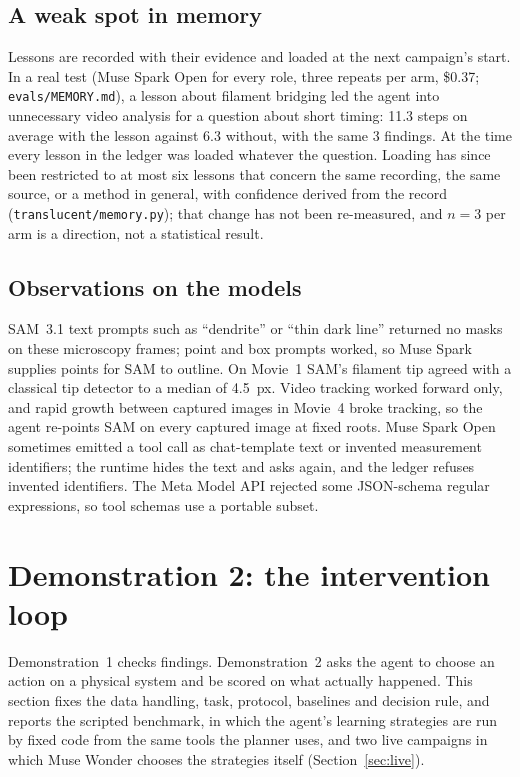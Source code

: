 \documentclass[11pt]{article}
\newcommand{\cmd}[1]{\texttt{#1}}
\begin{document}
\subsection{A weak spot in memory}
Lessons are recorded with their evidence and loaded at the next campaign's start. In a real test (Muse Spark Open for
every role, three repeats per arm, \$0.37; \cmd{evals/MEMORY.md}), a lesson about filament bridging led the agent
into unnecessary video analysis for a question about short timing: 11.3 steps on average with the lesson against 6.3
without, with the same 3 findings. At the time every lesson in the ledger was loaded whatever the question. Loading
has since been restricted to at most six lessons that concern the same recording, the same source, or a method in
general, with confidence derived from the record (\cmd{translucent/memory.py}); that change has not been re-measured,
and $n=3$ per arm is a direction, not a statistical result.

\subsection{Observations on the models}
SAM~3.1 text prompts such as ``dendrite'' or ``thin dark line'' returned no masks on these microscopy frames; point
and box prompts worked, so Muse Spark supplies points for SAM to outline. On Movie~1 SAM's filament tip agreed with a
classical tip detector to a median of 4.5~px. Video tracking worked forward only, and rapid growth between captured
images in Movie~4 broke tracking, so the agent re-points SAM on every captured image at fixed roots. Muse Spark Open
sometimes emitted a tool call as chat-template text or invented measurement identifiers; the runtime hides the text
and asks again, and the ledger refuses invented identifiers. The Meta Model API rejected some JSON-schema regular
expressions, so tool schemas use a portable subset.

\section{Demonstration 2: the intervention loop}\label{sec:demo2}

Demonstration~1 checks findings. Demonstration~2 asks the agent to choose an action on a physical system and be
scored on what actually happened. This section fixes the data handling, task, protocol, baselines and decision rule,
and reports the scripted benchmark, in which the agent's learning strategies are run by fixed code from the same tools
the planner uses, and two live campaigns in which Muse Wonder chooses the strategies itself
(Section~\ref{sec:live}).
\end{document}
